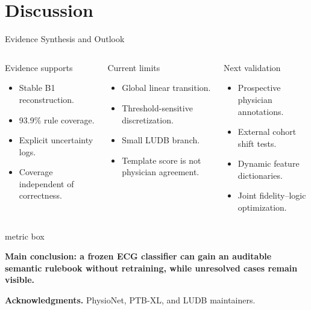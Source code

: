 \documentclass[aspectratio=169,xcolor=dvipsnames]{beamer}
\newcommand{\compactitem}{\setlength{\itemsep}{0.28em}\setlength{\parskip}{0pt}}
\begin{document}
\section{Discussion}

\begin{frame}{Evidence Synthesis and Outlook}
\small
\begin{columns}[T,onlytextwidth]
  \begin{exampleblock}{Evidence supports}
  \scriptsize
  \begin{itemize}\compactitem
    \item Stable B1 reconstruction.
    \item 93.9\% rule coverage.
    \item Explicit uncertainty logs.
    \item Coverage independent of correctness.
  \end{itemize}
  \end{exampleblock}

  \begin{alertblock}{Current limits}
  \scriptsize
  \begin{itemize}\compactitem
    \item Global linear transition.
    \item Threshold-sensitive discretization.
    \item Small LUDB branch.
    \item Template score is not physician agreement.
  \end{itemize}
  \end{alertblock}

  \begin{block}{Next validation}
  \scriptsize
  \begin{itemize}\compactitem
    \item Prospective physician annotations.
    \item External cohort shift tests.
    \item Dynamic feature dictionaries.
    \item Joint fidelity--logic optimization.
  \end{itemize}
  \end{block}
\end{columns}
\vspace{0.18em}
\begin{beamercolorbox}[wd=0.97\linewidth,sep=0.55em]{metric box}
{\small\centering\bfseries
Main conclusion: a frozen ECG classifier can gain an auditable semantic
rulebook without retraining, while unresolved cases remain visible.
\par}
\end{beamercolorbox}
\vfill
{\scriptsize
\textbf{Acknowledgments.} PhysioNet, PTB-XL, and LUDB maintainers.
\par}
\end{frame}
\end{document}
